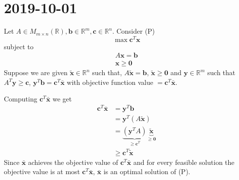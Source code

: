 \section{2019-10-01}
Let $A\in M_{m\times n}(\mathbb{R}), \mathbf{b}\in\mathbb{R}^m, \mathbf{c}\in\mathbb{R}^n$.
Consider (P)
\[\max \mathbf{c}^T\mathbf{x}\]
subject to
\begin{align*}
    A\mathbf{x}=\mathbf{b}\\
    \mathbf{x}\ge\mathbf{0}
\end{align*}
Suppose we are given
$\mathbf{\tilde{x}}\in\mathbb{R}^n$ such that, $A\mathbf{\tilde{x}}=\mathbf{b}$,
$\mathbf{\tilde{x}}\ge\mathbf{0}$
and
$\mathbf{y}\in\mathbb{R}^m$ such that $A^T\mathbf{y}\ge\mathbf{c}$,
$\mathbf{y}^T\mathbf{b}=\mathbf{c}^T\mathbf{\bar{x}}$ with objective function
value $=\mathbf{c}^T\mathbf{\bar{x}}$.


Computing $\mathbf{c}^T\mathbf{\bar{x}}$ we get
\begin{align*}
    \mathbf{c}^T\mathbf{\bar{x}}&=\mathbf{y}^T\mathbf{b}\\
    &=\mathbf{y}^T(A\mathbf{\tilde{x}})\\
    &=
    \underbrace{(\mathbf{y}^TA)}_{\ge \mathbf{c}^T}
    \underbrace{\mathbf{\tilde{x}}}_{\ge \mathbf{0}}\\
    &\ge \mathbf{c}^T\mathbf{\tilde{x}}
\end{align*}
Since $\mathbf{\bar{x}}$ achieves the objective value of 
$\mathbf{c}^T\mathbf{\bar{x}}$ and for every feasible solution the objective
value is at most $\mathbf{c}^T\mathbf{\bar{x}}$, $\mathbf{\bar{x}}$ is an
optimal solution of (P).

